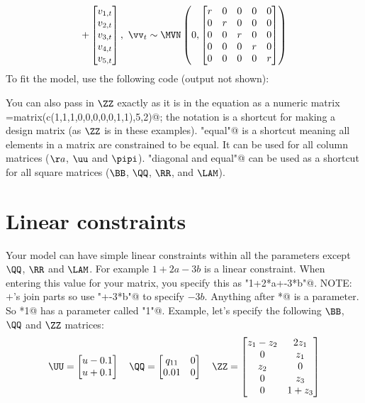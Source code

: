 \begin{gather*}
+ \begin{bmatrix}v_{1,t}\\ v_{2,t}\\ v_{3,t}\\ v_{4,t}\\ v_{5,t}\end{bmatrix}, 
 \textrm{ } \vv_t \sim \MVN\begin{pmatrix}0,\begin{bmatrix}r&0&0&0&0\\0&r&0&0&0\\0&0&r&0&0\\0&0&0&r&0\\0&0&0&0&r\end{bmatrix} \end{pmatrix}  \\
\end{gather*}
To fit the model, use the following code (output not shown):

You can also pass in $\ZZ$ exactly as it is in the equation as a numeric matrix \verb@Z=matrix(c(1,1,1,0,0,0,0,0,1,1),5,2)@; the \verb@factor@ notation is a shortcut for making a design matrix (as $\ZZ$ is in these examples).  \verb@"equal"@ is a shortcut meaning all elements in a matrix are constrained to be equal.  It can be used for all column matrices ($\aa$, $\uu$ and $\pipi$).  \verb@"diagonal and equal"@ can be used as a shortcut for all square matrices ($\BB$, $\QQ$, $\RR$, and $\LAM$).

\section{Linear constraints}

Your model can have simple linear constraints within all the parameters except $\QQ$, $\RR$ and $\LAM$.  For example $1+2a-3b$ is a linear constraint. When entering this value for your matrix, you specify this as \verb@"1+2*a+-3*b"@. NOTE: $+$'s join parts so use \verb@"+-3*b"@ to specify $-3b$. Anything after \verb@*@ is a parameter. So *1@ has a parameter called \verb@"1"@. Example, let's specify the following $\BB$, $\QQ$ and $\ZZ$ matrices:
\begin{equation*}
\UU = \begin{bmatrix}u-0.1\\ u+0.1\end{bmatrix}\quad
\QQ = \begin{bmatrix}q_{11}&0\\ 0.01&0\end{bmatrix}\quad
\ZZ = \begin{bmatrix}z_1-z_2&2z_1\\ 0&z_1\\ z_2&0 \\ 0&z_3 \\ 0&1+z_3\end{bmatrix}
\end{equation*}

